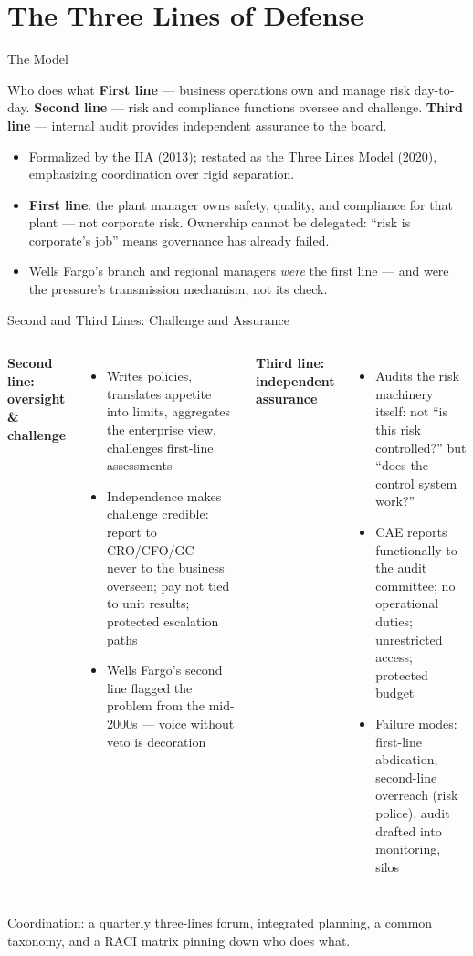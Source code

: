 \documentclass[11pt, aspectratio=169]{beamer}
\begin{document}
\section{The Three Lines of Defense}

\begin{frame}{The Model}
\begin{block}{Who does what}
\textbf{First line} --- business operations \alert{own and manage} risk day-to-day. \quad
\textbf{Second line} --- risk and compliance functions \alert{oversee and challenge}. \quad
\textbf{Third line} --- internal audit provides \alert{independent assurance} to the board.
\end{block}
\medskip
\begin{itemize}
  \item Formalized by the IIA (2013); restated as the Three Lines Model (2020), emphasizing coordination over rigid separation.
  \item \textbf{First line}: the plant manager owns safety, quality, and compliance for that plant --- not corporate risk. Ownership \alert{cannot be delegated}: ``risk is corporate's job'' means governance has already failed.
  \item Wells Fargo's branch and regional managers \emph{were} the first line --- and were the pressure's transmission mechanism, not its check.
\end{itemize}
\end{frame}

\begin{frame}{Second and Third Lines: Challenge and Assurance}
\begin{columns}[T]
\textbf{Second line: oversight \& challenge}
\begin{itemize}
  \item Writes policies, translates appetite into limits, aggregates the enterprise view, challenges first-line assessments
  \item Independence makes challenge credible: report to CRO/CFO/GC --- never to the business overseen; pay not tied to unit results; protected escalation paths
  \item Wells Fargo's second line flagged the problem from the mid-2000s --- \alert{voice without veto is decoration}
\end{itemize}
\textbf{Third line: independent assurance}
\begin{itemize}
  \item Audits the risk machinery itself: not ``is this risk controlled?'' but ``does the control system work?''
  \item CAE reports functionally to the audit committee; no operational duties; unrestricted access; protected budget
  \item Failure modes: first-line abdication, second-line overreach (risk police), audit drafted into monitoring, silos
\end{itemize}
\end{columns}
\medskip
Coordination: a quarterly three-lines forum, integrated planning, a common taxonomy, and a RACI matrix pinning down who does what.
\end{frame}
\end{document}
